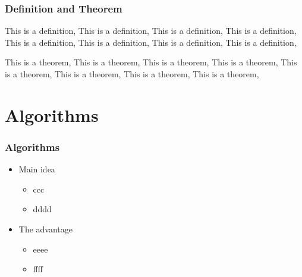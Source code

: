 \documentclass[10pt,compress,t]{beamer}
\begin{document}
\begin{frame}
  \frametitle{\bf Definition and Theorem}
\begin{definition}[Hello]
  This is a definition, This is a definition,
  This is a definition, This is a definition,
  This is a definition, This is a definition,
  This is a definition, This is a definition,
\end{definition}
\bigskip

\begin{theorem}[World]
  This is a theorem, This is a theorem,
  This is a theorem, This is a theorem,
  This is a theorem, This is a theorem,
  This is a theorem, This is a theorem,
\end{theorem}
\end{frame}



\section[Algorithms]{Algorithms}
\begin{frame}%
  \frametitle{\bf Algorithms}

\begin{itemize}
\item Main idea
    \begin{itemize}
        \item ccc
        \item dddd
    \end{itemize}\smallskip

\item<2-> The advantage
    \begin{itemize}
        \item  eeee
        \item  ffff
    \end{itemize}\smallskip

\end{itemize}

\end{frame}
\end{document}
